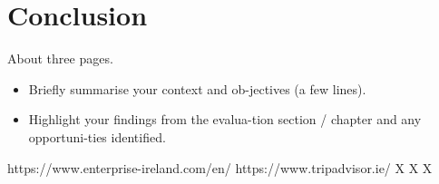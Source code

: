 \chapter{Conclusion}
About three pages.

\begin{itemize}
\item Briefly summarise your context and ob-jectives (a few lines).
\item Highlight your findings from the evalua-tion section / chapter and any opportuni-ties identified.
\end{itemize}

\begin{thebibliography}{1}
	https://www.enterprise-ireland.com/en/
	https://www.tripadvisor.ie/
	 X
	 X
	 X
\end{thebibliography}


